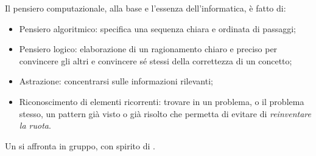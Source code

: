 \documentclass[../main]{subfiles}
\begin{document}
Il pensiero computazionale, alla base e l’essenza dell’informatica, è fatto di:
\begin{itemize}
    \item Pensiero algoritmico: specifica una sequenza chiara e ordinata di passaggi;
    \item Pensiero logico: elaborazione di un ragionamento chiaro e preciso per convincere gli altri e convincere sé stessi della correttezza di un concetto;
    \item Astrazione: concentrarsi sulle informazioni rilevanti;
    \item Riconoscimento di elementi ricorrenti: trovare in un problema, o il problema stesso, un pattern già visto o già risolto che permetta di evitare di \textit{reinventare la ruota}.
\end{itemize}
Un  si affronta in gruppo, con spirito di .
\end{document}
